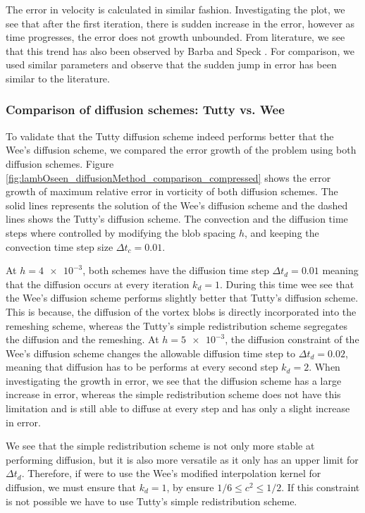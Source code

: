 The error in velocity is calculated in similar fashion. Investigating the plot, we see that after the first iteration, there is sudden increase in the error, however as time progresses, the error does not growth unbounded. From literature, we see that this trend has also been observed by Barba \cite{Barba2004c} and Speck \cite{Speck2011a}. For comparison, we used similar parameters and observe that the sudden jump in error has been similar to the literature.
	
\subsubsection*{Comparison of diffusion schemes: Tutty vs. Wee}

To validate that the Tutty diffusion scheme indeed performs better that the Wee's diffusion scheme, we compared the error growth of the problem using both diffusion schemes. Figure \ref{fig:lambOseen_diffusionMethod_comparison_compressed} shows the error growth of maximum relative error in vorticity of both diffusion schemes. The solid lines represents the solution of the Wee's diffusion scheme and the dashed lines shows the Tutty's diffusion scheme. The convection and the diffusion time steps where controlled by modifying the blob spacing $h$, and keeping the convection time step size $\Delta t_c = 0.01$. 

At $h = \num{4e-3}$, both schemes have the diffusion time step $\Delta t_d = 0.01$ meaning that the diffusion occurs at every iteration $k_d = 1$. During this time wee see that the Wee's diffusion scheme performs slightly better that Tutty's diffusion scheme. This is because, the diffusion of the vortex blobs is directly incorporated into the remeshing scheme, whereas the Tutty's simple redistribution scheme segregates the diffusion and the remeshing. At $h = \num{5e-3}$, the diffusion constraint of the Wee's diffusion scheme changes the allowable diffusion time step to $\Delta t_d = 0.02$, meaning that diffusion has to be performs at every second step $k_d=2$. When investigating the growth in error, we see that the diffusion scheme has a large increase in error, whereas the simple redistribution scheme does not have this limitation and is still able to diffuse at every step and has only a slight increase in error.

We see that the simple redistribution scheme is not only more stable at performing diffusion, but it is also more versatile as it only has an upper limit for $\Delta t_d$. Therefore, if were to use the Wee's modified interpolation kernel for diffusion, we must ensure that $k_d = 1$, by ensure $1/6 \le c^2 \le 1/2$. If this constraint is not possible we have to use Tutty's simple redistribution scheme.

